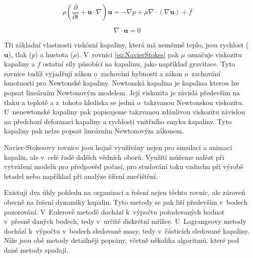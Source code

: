 \begin{equation}
	\rho\left(\frac{\partial}{\partial t} + \mathbf{u} \cdot \nabla\right)\mathbf{u} = -\nabla p + \mu\nabla\cdot(\nabla \mathbf{u}) + f
	\label{eq:NavierStokes}
\end{equation}

\begin{equation}
	\nabla \cdot \mathbf{u} = 0
	\label{eq:NavierStokes2}
\end{equation}

Tři základní vlastnosti viskózní kapaliny, která má neměnné teplo, jsou rychlost ($\mathbf{u}$), tlak ($p$) a hustota ($\rho$). V~rovnici \ref{eq:NavierStokes} pak $\mu$ označuje viskozitu kapaliny a $f$ ostatní síly působící na kapalinu, jako například gravitace. Tyto rovnice tudíž vyjadřují zákon o~zachování hybnosti a zákon o~zachování hmotnosti pro Newtonské kapaliny. Newtonská kapalina je kapalina kterou lze popsat lineárním Newtonovým modelem. Její viskozita je závislá především na tlaku a teplotě a z~tohoto hlediska se jedná o~takzvanou Newtonskou viskozitu. U~nenewtonské kapaliny pak popisujeme takzvanou zdánlivou viskozitu závislou na předchozí deformaci kapaliny a rychlosti vnitřního smyku kapaliny. Tyto kapaliny pak nelze popsat lineárním Newtonovým zákonem.\cite{StejskalJan2013Pmks}

Navier-Stokesovy rovnice jsou hojně využívány nejen pro simulaci a animaci kapalin, ale v~celé řadě dalších vědních oborů. Využití můžeme nalézt při vytváření modelů pro předpověď počasí, pro studování toku vzduchu při výrobě letadel nebo například při analýze šíření znečištění.
\break

Existují dva úhly pohledu na organizaci a řešení nejen těchto rovnic, ale zároveň obecně na řešení dynamiky kapalin. Tyto metody se pak liší především v~bodech pozorování. V~Eulerově metodě dochází k~výpočtu požadovaných hodnot v~přesně daných bodech, tedy v~určité diskrétní mřížce. U~Lagrangeovy metody dochází k~výpočtu v~bodech sledované masy, tedy v~částicích sledované kapaliny. Níže jsou obě metody detailněji popsány, včetně několika algoritmů, které pod dané metody spadají.

